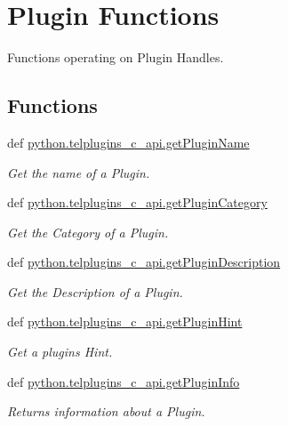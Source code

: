 \hypertarget{group__plugins}{\section{Plugin Functions}
\label{group__plugins}
}


Functions operating on Plugin Handles.  


\subsection*{Functions}
\begin{DoxyCompactItemize}
\item 
def \hyperlink{group__plugins_ga530acb5427e828f9e7207722c63f050d}{python.\-telplugins\-\_\-c\-\_\-api.\-get\-Plugin\-Name}
\begin{DoxyCompactList}\small\item\em Get the name of a Plugin. \end{DoxyCompactList}\item 
def \hyperlink{group__plugins_ga7b5b231df505052b8736d4791ecc0bbe}{python.\-telplugins\-\_\-c\-\_\-api.\-get\-Plugin\-Category}
\begin{DoxyCompactList}\small\item\em Get the Category of a Plugin. \end{DoxyCompactList}\item 
def \hyperlink{group__plugins_ga848654b1e49b52c48a4a61d7852e9a43}{python.\-telplugins\-\_\-c\-\_\-api.\-get\-Plugin\-Description}
\begin{DoxyCompactList}\small\item\em Get the Description of a Plugin. \end{DoxyCompactList}\item 
def \hyperlink{group__plugins_gab899dd3d0097a54cf6759a2733ee83d3}{python.\-telplugins\-\_\-c\-\_\-api.\-get\-Plugin\-Hint}
\begin{DoxyCompactList}\small\item\em Get a plugins Hint. \end{DoxyCompactList}\item 
def \hyperlink{group__plugins_gab0ebad86bd5e782373250db6960f4fbe}{python.\-telplugins\-\_\-c\-\_\-api.\-get\-Plugin\-Info}
\begin{DoxyCompactList}\small\item\em Returns information about a Plugin. \end{DoxyCompactList}\item 

\end{DoxyCompactItemize}
